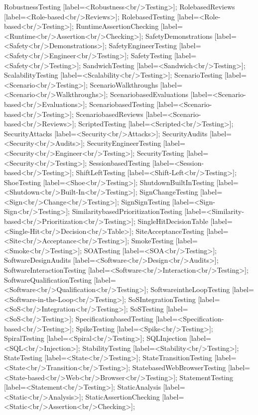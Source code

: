 \documentclass{article}
\begin{document}
{RobustnessTesting [label=<Robustness<br/>Testing>];
RolebasedReviews [label=<Role-based<br/>Reviews>];
RolebasedTesting [label=<Role-based<br/>Testing>];
RuntimeAssertionChecking [label=<Runtime<br/>Assertion<br/>Checking>];
SafetyDemonstrations [label=<Safety<br/>Demonstrations>];
SafetyEngineerTesting [label=<Safety<br/>Engineer<br/>Testing>];
SafetyTesting [label=<Safety<br/>Testing>];
SandwichTesting [label=<Sandwich<br/>Testing>];
ScalabilityTesting [label=<Scalability<br/>Testing>];
ScenarioTesting [label=<Scenario<br/>Testing>];
ScenarioWalkthroughs [label=<Scenario<br/>Walkthroughs>];
ScenariobasedEvaluations [label=<Scenario-based<br/>Evaluations>];
ScenariobasedTesting [label=<Scenario-based<br/>Testing>];
ScenariobasedReviews [label=<Scenario-based<br/>Reviews>];
ScriptedTesting [label=<Scripted<br/>Testing>];
SecurityAttacks [label=<Security<br/>Attacks>];
SecurityAudits [label=<Security<br/>Audits>];
SecurityEngineerTesting [label=<Security<br/>Engineer<br/>Testing>];
SecurityTesting [label=<Security<br/>Testing>];
SessionbasedTesting [label=<Session-based<br/>Testing>];
ShiftLeftTesting [label=<Shift-Left<br/>Testing>];
ShoeTesting [label=<Shoe<br/>Testing>];
ShutdownBuiltInTesting [label=<Shutdown<br/>Built-In<br/>Testing>];
SignChangeTesting [label=<Sign<br/>Change<br/>Testing>];
SignSignTesting [label=<Sign-Sign<br/>Testing>];
SimilaritybasedPrioritizationTesting [label=<Similarity-based<br/>Prioritization<br/>Testing>];
SingleHitDecisionTable [label=<Single-Hit<br/>Decision<br/>Table>];
SiteAcceptanceTesting [label=<Site<br/>Acceptance<br/>Testing>];
SmokeTesting [label=<Smoke<br/>Testing>];
SOATesting [label=<SOA<br/>Testing>];
SoftwareDesignAudits [label=<Software<br/>Design<br/>Audits>];
SoftwareInteractionTesting [label=<Software<br/>Interaction<br/>Testing>];
SoftwareQualificationTesting [label=<Software<br/>Qualification<br/>Testing>];
SoftwareintheLoopTesting [label=<Software-in-the-Loop<br/>Testing>];
SoSIntegrationTesting [label=<SoS<br/>Integration<br/>Testing>];
SoSTesting [label=<SoS<br/>Testing>];
SpecificationbasedTesting [label=<Specification-based<br/>Testing>];
SpikeTesting [label=<Spike<br/>Testing>];
SpiralTesting [label=<Spiral<br/>Testing>];
SQLInjection [label=<SQL<br/>Injection>];
StabilityTesting [label=<Stability<br/>Testing>];
StateTesting [label=<State<br/>Testing>];
StateTransitionTesting [label=<State<br/>Transition<br/>Testing>];
StatebasedWebBrowserTesting [label=<State-based<br/>Web<br/>Browser<br/>Testing>];
StatementTesting [label=<Statement<br/>Testing>];
StaticAnalysis [label=<Static<br/>Analysis>];
StaticAssertionChecking [label=<Static<br/>Assertion<br/>Checking>];
}
\end{document}
